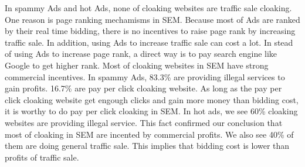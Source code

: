 In spammy Ads and hot Ads, none of cloaking websites are traffic sale cloaking. 
One reason is page ranking mechamisms in SEM.
Because most of Ads are ranked by their real time bidding, there is no incentives to raise page rank by increasing traffic sale.
In addition, using Ads to increase traffic sale can cost a lot. In stead of using Ads to increase page rank, a direct way
is to pay search engine like Google to get higher rank. Most of cloaking websites in SEM have strong commercial incentives. In spammy Ads,
83.3\% are providing illegal services to gain profits. 16.7\% are pay per click cloaking website. As long as the pay per click cloaking 
website get engough clicks and gain more money than bidding cost, it is worthy to do pay per click cloaking in SEM. In hot ads, we see 60\%
cloaking websites are providing illegal service. This fact confirmed our conclusion that most of cloaking in SEM are incented by commercial profits.
We also see 40\% of them are doing general traffic sale. This implies that bidding cost is lower than profits of traffic sale. 


%


